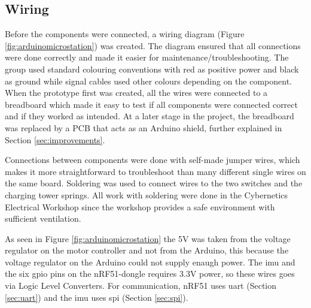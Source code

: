 \subsection{Wiring}
Before the components were connected, a wiring diagram (Figure \ref{fig:arduinomicrostation}) was created. The diagram ensured that all connections were done correctly and made it easier for maintenance/troubleshooting. The group used standard colouring conventions with red as positive power and black as ground while signal cables used other colours depending on the component. When the prototype first was created, all the wires were connected to a breadboard which made it easy to test if all components were connected correct and if they worked as intended. At a later stage in the project, the breadboard was replaced by a PCB that acts as an Arduino shield, further explained in Section \ref{sec:improvements}.

Connections between components were done with self-made jumper wires, which makes it more straightforward to troubleshoot than many different single wires on the same board. Soldering was used to connect wires to the two switches and the charging tower springs. All work with soldering were done in the Cybernetics Electrical Workshop since the workshop provides a safe environment with sufficient ventilation.

As seen in Figure \ref{fig:arduinomicrostation} the 5V was taken from the voltage regulator on the motor controller and not from the Arduino, this because the voltage regulator on the Arduino could not supply enaugh power. The \acrshort{imu} and the six \acrshort{gpio} pins on the nRF51-dongle requires 3.3V power, so these wires goes via Logic Level Converters. For communication, nRF51 uses \acrshort{uart} (Section \ref{sec:uart}) and the \acrshort{imu} uses \acrshort{spi} (Section \ref{sec:spi}).

